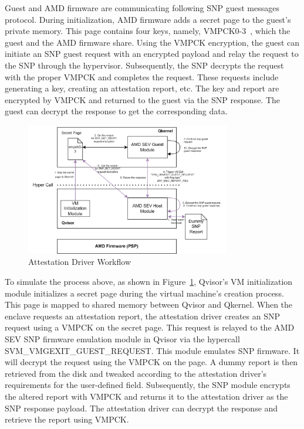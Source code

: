 Guest and AMD firmware are communicating following SNP guest messages protocol. During initialization, AMD firmware adds a secret page to the guest's private memory. This page contains four keys, namely, VMPCK0-3~\cite*{snp_firmware}, which the guest and the AMD firmware share. Using the VMPCK encryption,  the guest 
can initiate an SNP guest request with an encrypted payload and relay the request to the SNP through the hypervisor. Subsequently, the SNP decrypts the request with the proper VMPCK and completes the request. These requests include generating a key, creating an attestation report, etc. The key and 
report are encrypted by VMPCK and returned to the guest via the SNP response. The guest can decrypt the response to get the corresponding data.

\begin{figure}[htp]
    \centering
    \includegraphics[width=0.8\textwidth]{images/amd_snp_driver.png}
    \caption[Attestation Driver Workflow]{Attestation Driver Workflow}
    \label{fig:amd_snp_driver}
\end{figure}

To simulate the process above, as shown in Figure~\ref{fig:amd_snp_driver}, Qvisor's VM initialization module initializes a secret page during the virtual machine's creation process. This page is mapped to shared memory between Qvisor and Qkernel. When the enclave requests an attestation 
report, the attestation driver creates an  SNP request using a VMPCK on the secret page. This request is relayed to the AMD SEV SNP firmware emulation module in Qvisor via the hypercall SVM\_VMGEXIT\_GUEST\_REQUEST. This module emulates SNP firmware. It will decrypt the request 
using the VMPCK on the page. A dummy report is then retrieved from the disk and tweaked according to the attestation driver's requirements for the user-defined field. Subsequently, the SNP module encrypts the altered report with VMPCK and returns it to the attestation driver as the SNP response payload. The attestation driver can 
decrypt the response and retrieve the report using VMPCK.

